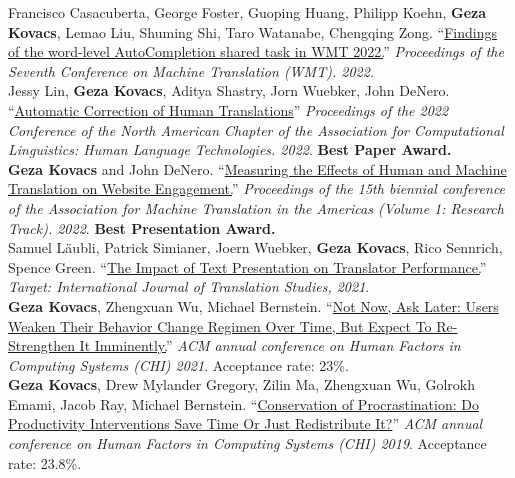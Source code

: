 
{\small Francisco Casacuberta, George Foster, Guoping Huang, Philipp Koehn,} \textbf{Geza Kovacs}, {\small Lemao Liu, Shuming Shi, Taro Watanabe, Chengqing Zong.} ``\href{https://aclanthology.org/2022.wmt-1.75.pdf}{Findings of the word-level AutoCompletion shared task in WMT 2022.}'' \emph{Proceedings of the Seventh Conference on Machine Translation (WMT). 2022.}\\

{\small Jessy Lin,} \textbf{Geza Kovacs}, {\small Aditya Shastry, Jorn Wuebker, John DeNero.} ``\href{https://aclanthology.org/2022.naacl-main.36.pdf}{Automatic Correction of Human Translations}'' \emph{Proceedings of the 2022 Conference of the North American Chapter of the Association for Computational Linguistics: Human Language Technologies. 2022}. \textbf{Best Paper Award.}\\

\textbf{Geza Kovacs} {\small and John DeNero.} ``\href{https://aclanthology.org/2022.amta-research.23.pdf}{Measuring the Effects of Human and Machine Translation on Website Engagement.}'' \emph{Proceedings of the 15th biennial conference of the Association for Machine Translation in the Americas (Volume 1: Research Track). 2022}. \textbf{Best Presentation Award.}\\

{\small Samuel Läubli, Patrick Simianer, Joern Wuebker,} \textbf{Geza Kovacs}, {\small Rico Sennrich, Spence Green.} ``\href{https://arxiv.org/pdf/2011.05978.pdf}{The Impact of Text Presentation on Translator Performance.}'' \emph{Target: International Journal of Translation Studies, 2021}.\\

\textbf{Geza Kovacs}, {\small Zhengxuan Wu, Michael Bernstein.} ``\href{https://hci.stanford.edu/publications/2021/notnow/notnowasklater.pdf}{Not Now, Ask Later: Users Weaken Their Behavior Change Regimen Over Time, But Expect To Re-Strengthen It Imminently.}'' \emph{ACM annual conference on Human Factors in Computing Systems (CHI) 2021}. Acceptance rate: 23\%.\\ %

\textbf{Geza Kovacs}, {\small Drew Mylander Gregory, Zilin Ma, Zhengxuan Wu, Golrokh Emami, Jacob Ray, Michael Bernstein.} ``\href{https://hci.stanford.edu/publications/2019/conservation/conservation-chi2019.pdf}{Conservation of Procrastination: Do Productivity Interventions Save Time Or Just Redistribute It?}'' \emph{ACM annual conference on Human Factors in Computing Systems (CHI) 2019}. Acceptance rate: 23.8\%.\\ %


